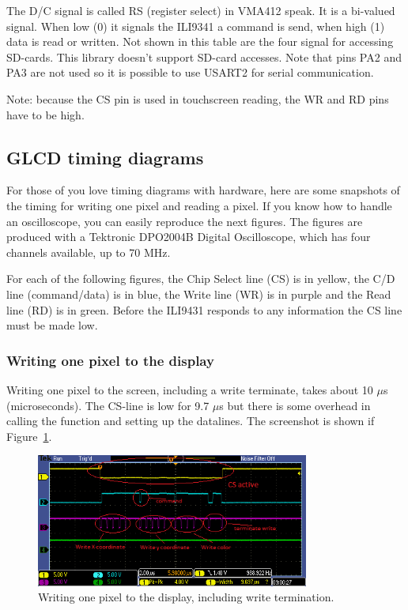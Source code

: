 \documentclass[12pt]{article}
\begin{document}
The D/C signal is called RS (register select) in VMA412  speak. It is a bi-valued signal. When low (0) it signals the ILI9341 a command is send, when high (1) data is read or written.
Not shown in this table are the four signal for accessing SD-cards. This library doesn't support SD-card accesses.
Note that pins PA2 and PA3 are not used so it is possible to use USART2 for serial communication.

Note: because the CS pin is used in touchscreen reading, the WR and RD pins have to be high.

\subsection{GLCD timing diagrams}
For those of you love timing diagrams with hardware, here are some snapshots of the timing for writing one pixel and reading a pixel. If you know how to handle an oscilloscope, you can easily reproduce the next figures. The figures are produced with a Tektronic DPO2004B Digital Oscilloscope, which has four channels available, up to 70 MHz.

For each of the following figures, the Chip Select line (CS) is in yellow, the C/D line (command/data) is in blue, the Write line (WR) is in purple and the Read line (RD) is in green. Before the ILI9431 responds to any information the CS line must be made low.

\subsubsection{Writing one pixel to the display}
Writing one pixel to the screen, including a write terminate, takes about 10 $\mu$s (microseconds). The CS-line is low for 9.7 $\mu$s but there is some overhead in calling the function and setting up the datalines. The screenshot is shown if Figure~\ref{fig:10}.

\begin{figure}[!ht]
\centering
\includegraphics[width=0.8\textwidth]{pixel_write}
\caption{Writing one pixel to the display, including write termination.}
\label{fig:10}
\end{figure}
\end{document}
